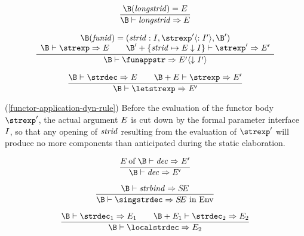 \begin{equation}	%
\frac{\B(\longstrid)=\E}
     {\B\ts\longstrid\ra\E}
\end{equation}

\vspace{6pt}
\begin{equation}		%
\label{functor-application-dyn-rule}
\frac{ \begin{array}{c}
        \B(\funid)=(\strid:\I,\strexp'\langle:\I'\rangle,\B')\\
        \B\ts\strexp\ra\E\qquad
       \B'+\{\strid\mapsto\E\downarrow\I\}\ts\strexp'\ra\E'\\
       \end{array}
     }
     {\B\ts\funappstr\ra\E'\langle\downarrow\I'\rangle}
\end{equation}

\vspace{6pt}
\begin{equation}	%
\frac{\B\ts\strdec\ra\E\qquad\B+\E\ts\strexp\ra\E'}
     {\B\ts\letstrexp\ra\E'}
\end{equation}
\comments
\begin{description}
\item{(\ref{functor-application-dyn-rule})}
Before the evaluation of the functor body $\strexp'$, the
actual argument $E$ is cut down by the formal parameter
interface $I$, so that any opening of ${\it strid}$ resulting
from the evaluation of $\strexp'$ will produce no more components
than anticipated during the static elaboration.
\end{description}

\begin{equation}                %
\frac{ \of{\E}{\B}\ts\dec\ra\E' }
     { \B\ts\dec\ra\E' }\index{60.2}
\end{equation}

\vspace{6pt}
\begin{equation}        	%
\frac{ \B\ts\strbind\ra\SE }
     { \B\ts\singstrdec\ra\SE\ \In\ \Env }
\end{equation}

\vspace{6pt}
\begin{equation}                %
\frac{ \B\ts\strdec_1\ra\E_1\qquad
       \B+\E_1\ts\strdec_2\ra\E_2 }
     { \B\ts\localstrdec\ra\E_2 }
\end{equation}


